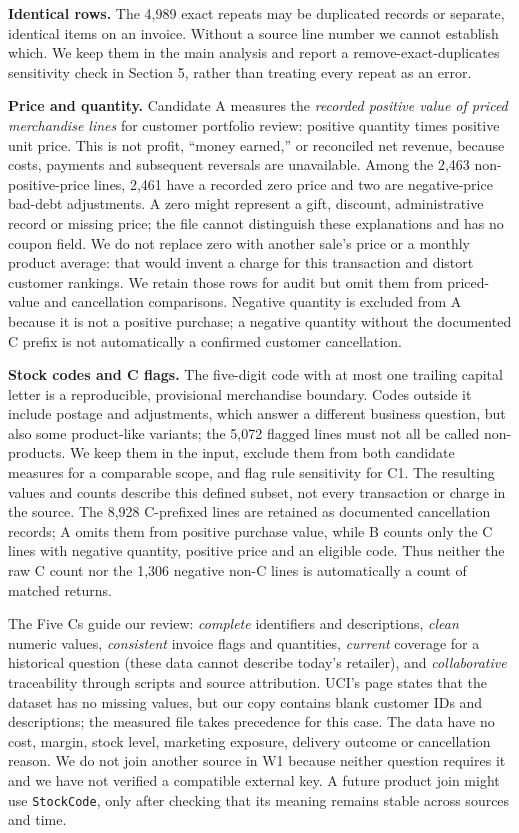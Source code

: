 \documentclass[10pt,a4paper]{article}
\begin{document}
\textbf{Identical rows.} The 4,989 exact repeats may be duplicated records or separate, identical items on an invoice. Without a source line number we cannot establish which. We keep them in the main analysis and report a remove-exact-duplicates sensitivity check in Section 5, rather than treating every repeat as an error.

\textbf{Price and quantity.} Candidate A measures the \emph{recorded positive value of priced merchandise lines} for customer portfolio review: positive quantity times positive unit price. This is not profit, ``money earned,'' or reconciled net revenue, because costs, payments and subsequent reversals are unavailable. Among the 2,463 non-positive-price lines, 2,461 have a recorded zero price and two are negative-price bad-debt adjustments. A zero might represent a gift, discount, administrative record or missing price; the file cannot distinguish these explanations and has no coupon field. We do not replace zero with another sale's price or a monthly product average: that would invent a charge for this transaction and distort customer rankings. We retain those rows for audit but omit them from priced-value and cancellation comparisons. Negative quantity is excluded from A because it is not a positive purchase; a negative quantity without the documented C prefix is not automatically a confirmed customer cancellation.

\textbf{Stock codes and C flags.} The five-digit code with at most one trailing capital letter is a reproducible, provisional merchandise boundary. Codes outside it include postage and adjustments, which answer a different business question, but also some product-like variants; the 5,072 flagged lines must not all be called non-products. We keep them in the input, exclude them from both candidate measures for a comparable scope, and flag rule sensitivity for C1. The resulting values and counts describe this defined subset, not every transaction or charge in the source. The 8,928 C-prefixed lines are retained as documented cancellation records; A omits them from positive purchase value, while B counts only the C lines with negative quantity, positive price and an eligible code. Thus neither the raw C count nor the 1,306 negative non-C lines is automatically a count of matched returns.

The Five Cs guide our review: \emph{complete} identifiers and descriptions, \emph{clean} numeric values, \emph{consistent} invoice flags and quantities, \emph{current} coverage for a historical question (these data cannot describe today's retailer), and \emph{collaborative} traceability through scripts and source attribution. UCI's page states that the dataset has no missing values, but our copy contains blank customer IDs and descriptions; the measured file takes precedence for this case. The data have no cost, margin, stock level, marketing exposure, delivery outcome or cancellation reason. We do not join another source in W1 because neither question requires it and we have not verified a compatible external key. A future product join might use \texttt{StockCode}, only after checking that its meaning remains stable across sources and time.
\end{document}
